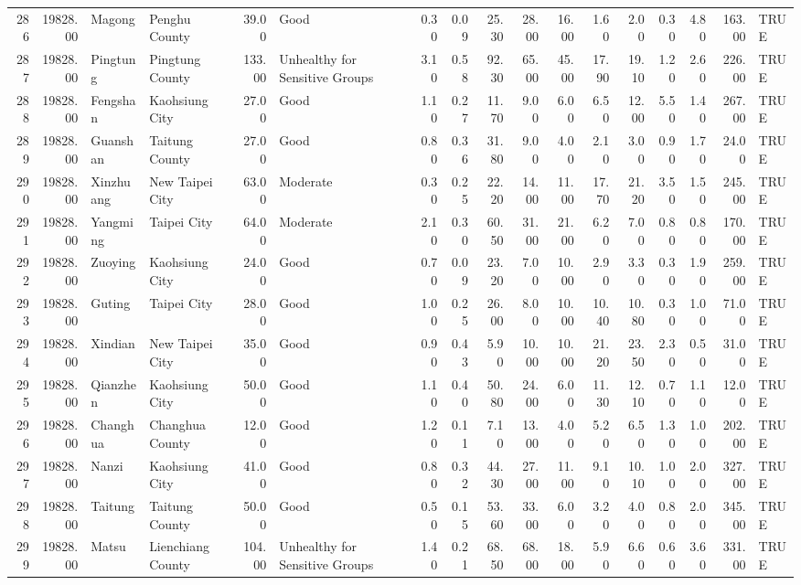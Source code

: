 \begin{table}[ht]
\begin{tabular}{rrllrlrrrrrrrrrrl}
  286 & 19828.00 & Magong & Penghu County & 39.00 & Good & 0.30 & 0.09 & 25.30 & 28.00 & 16.00 & 1.60 & 2.00 & 0.30 & 4.80 & 163.00 & TRUE \\ 
  287 & 19828.00 & Pingtung & Pingtung County & 133.00 & Unhealthy for Sensitive Groups & 3.10 & 0.58 & 92.30 & 65.00 & 45.00 & 17.90 & 19.10 & 1.20 & 2.60 & 226.00 & TRUE \\ 
  288 & 19828.00 & Fengshan & Kaohsiung City & 27.00 & Good & 1.10 & 0.27 & 11.70 & 9.00 & 6.00 & 6.50 & 12.00 & 5.50 & 1.40 & 267.00 & TRUE \\ 
  289 & 19828.00 & Guanshan & Taitung County & 27.00 & Good & 0.80 & 0.36 & 31.80 & 9.00 & 4.00 & 2.10 & 3.00 & 0.90 & 1.70 & 24.00 & TRUE \\ 
  290 & 19828.00 & Xinzhuang & New Taipei City & 63.00 & Moderate & 0.30 & 0.25 & 22.20 & 14.00 & 11.00 & 17.70 & 21.20 & 3.50 & 1.50 & 245.00 & TRUE \\ 
  291 & 19828.00 & Yangming & Taipei City & 64.00 & Moderate & 2.10 & 0.30 & 60.50 & 31.00 & 21.00 & 6.20 & 7.00 & 0.80 & 0.80 & 170.00 & TRUE \\ 
  292 & 19828.00 & Zuoying & Kaohsiung City & 24.00 & Good & 0.70 & 0.09 & 23.20 & 7.00 & 10.00 & 2.90 & 3.30 & 0.30 & 1.90 & 259.00 & TRUE \\ 
  293 & 19828.00 & Guting & Taipei City & 28.00 & Good & 1.00 & 0.25 & 26.00 & 8.00 & 10.00 & 10.40 & 10.80 & 0.30 & 1.00 & 71.00 & TRUE \\ 
  294 & 19828.00 & Xindian & New Taipei City & 35.00 & Good & 0.90 & 0.43 & 5.90 & 10.00 & 10.00 & 21.20 & 23.50 & 2.30 & 0.50 & 31.00 & TRUE \\ 
  295 & 19828.00 & Qianzhen & Kaohsiung City & 50.00 & Good & 1.10 & 0.40 & 50.80 & 24.00 & 6.00 & 11.30 & 12.10 & 0.70 & 1.10 & 12.00 & TRUE \\ 
  296 & 19828.00 & Changhua & Changhua County & 12.00 & Good & 1.20 & 0.11 & 7.10 & 13.00 & 4.00 & 5.20 & 6.50 & 1.30 & 1.00 & 202.00 & TRUE \\ 
  297 & 19828.00 & Nanzi & Kaohsiung City & 41.00 & Good & 0.80 & 0.32 & 44.30 & 27.00 & 11.00 & 9.10 & 10.10 & 1.00 & 2.00 & 327.00 & TRUE \\ 
  298 & 19828.00 & Taitung & Taitung County & 50.00 & Good & 0.50 & 0.15 & 53.60 & 33.00 & 6.00 & 3.20 & 4.00 & 0.80 & 2.00 & 345.00 & TRUE \\ 
  299 & 19828.00 & Matsu & Lienchiang County & 104.00 & Unhealthy for Sensitive Groups & 1.40 & 0.21 & 68.50 & 68.00 & 18.00 & 5.90 & 6.60 & 0.60 & 3.60 & 331.00 & TRUE \\ 

\end{tabular}
\end{table}
